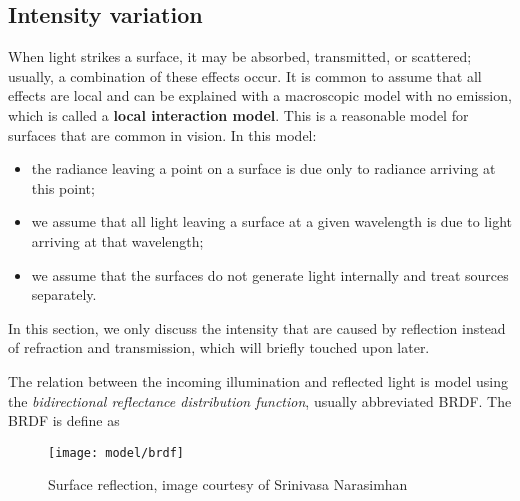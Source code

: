 

\subsection{Intensity variation}
When light strikes a surface, it may be absorbed, transmitted, or scattered; usually, a combination of these effects occur. It is common to assume that all effects are local and can be explained with a macroscopic model with no emission, which is called a \textbf{local interaction model}. This is a reasonable model for surfaces that are common in vision. In this model:
\begin{itemize}
\item the radiance leaving a point on a surface is due only to radiance arriving at this point;
\item we assume that all light leaving a surface at a given wavelength is due to light arriving at that wavelength;
\item we assume that the surfaces do not generate light internally and treat sources separately.
\end{itemize}

In this section, we only discuss the intensity that are caused by reflection instead of refraction and transmission, which will briefly touched upon later.

The relation between the incoming illumination and reflected light is model using the \textit{bidirectional reflectance distribution function}, usually abbreviated BRDF. The BRDF is define as

\begin{figure}[h]
\centering
\texttt{[image: model/brdf]}
\caption{Surface reflection, image courtesy of Srinivasa Narasimhan}
\end{figure}

